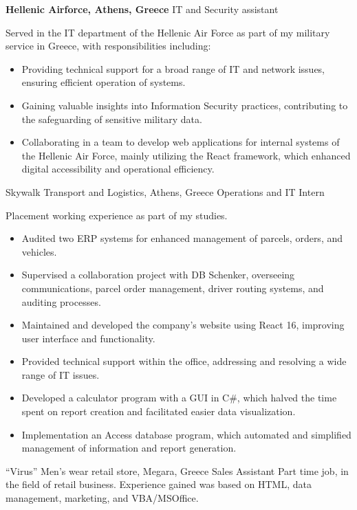 {\textbf{Hellenic Airforce, Athens, Greece}}
{IT and Security assistant}
{
    Served in the IT department of the Hellenic Air Force as part of my military service in Greece, with
    responsibilities including:
    \begin{itemize}
        \item  Providing technical support for a broad range of IT and network issues, ensuring efficient operation of systems.
        \item Gaining valuable insights into Information Security practices, contributing to the safeguarding of sensitive military data.
        \item Collaborating in a team to develop web applications for internal systems of the Hellenic Air Force, mainly utilizing the React framework, which enhanced digital accessibility and operational efficiency.
    \end{itemize}
}

{Skywalk Transport and Logistics, Athens, Greece }
{Operations and IT Intern}
{

    Placement working experience as part of my studies.
    \begin{itemize}
        \item Audited two ERP systems for enhanced management of parcels, orders, and vehicles.
        \item Supervised a collaboration project with DB Schenker, overseeing communications, parcel order management, driver routing systems, and auditing processes.
        \item Maintained and developed the company's website using React 16, improving user interface and functionality.
        \item Provided technical support within the office, addressing and resolving a wide range of IT issues.
        \item Developed a calculator program with a GUI in C#, which halved the time spent on report creation and facilitated easier data visualization.
        \item Implementation an Access database program, which automated and simplified management of information and report generation.

    \end{itemize}
}

{“Virus” Men’s wear retail store, Megara, Greece}
{Sales Assistant}
{
    Part time job, in the field of retail business. Experience gained was based on HTML, data management, marketing, and VBA/MSOffice.
}

